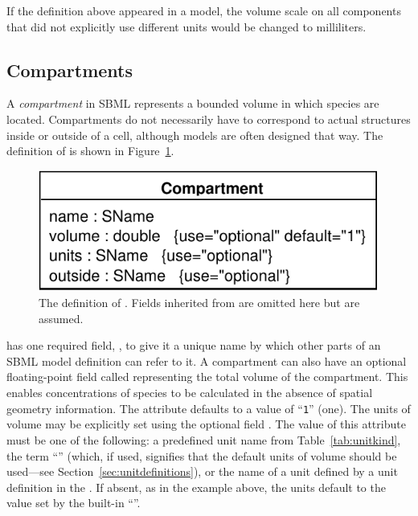\documentclass[10pt]{cekarticle}
\newcommand{\vref}[1]{\ref{#1}}
\newenvironment{blockChanged}{\color{BrickRed}}{}
\begin{document}
If the definition above appeared in a model, the volume scale on all
components that did not explicitly use different units would be changed to
milliliters.  


\subsection{Compartments}
\label{sec:compartments}

A \emph{compartment} in SBML represents a bounded volume in which species
are located.  Compartments do not necessarily have to correspond to actual
structures inside or outside of a cell, although models are often designed
that way.  The definition of  is shown in
Figure~\vref{fig:compartment}.

\begin{figure}[htb]
  \vspace*{1pt}
  \centering
  \includegraphics[scale = 0.65]{compartment}
  \vspace*{-3pt}
  \caption{The definition of .  
    Fields inherited from  are omitted here but are assumed.}
  \label{fig:compartment}
\end{figure}

\begin{blockChanged}
 has one required field,
, to give it a unique name by which other parts of an SBML
model definition can refer to it.  A compartment can also have an optional
floating-point field called  representing the total volume
of the compartment.  This enables concentrations of species to be
calculated in the absence of spatial geometry information.%
\end{blockChanged}
The  attribute defaults to a value of ``\texttt{1}'' (one).
\begin{blockChanged}
The units of volume may be explicitly set using the optional field
.  The value of this attribute must be one of the following:
a predefined unit name from Table~\ref{tab:unitkind}, the term
``'' (which, if used, signifies that the default units of
volume should be used---see Section~\ref{sec:unitdefinitions}), or the
name of a unit defined by a unit definition in the 
.  If absent, as in the example above, the units default to
the value set by the built-in ``''.\end{blockChanged}
\end{document}
